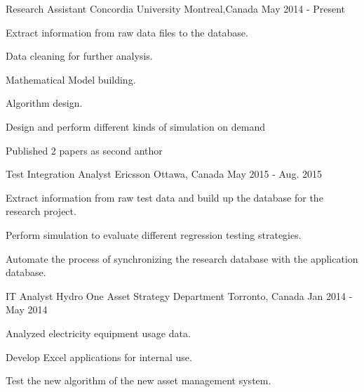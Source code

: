 \documentclass[11pt, a4paper]{awesome-cv} %
\begin{document}
\begin{cventries}
	\cventry
	{Research Assistant} %
	{Concordia University} %
	{Montreal,Canada} %
	{May 2014 - Present} %
	{ %
		\begin{cvitems}
			\item {Extract information from raw data files to the database.}
			\item {Data cleaning for further analysis.}
			\item {Mathematical Model building.}
			\item {Algorithm design.}
			\item {Design and perform different kinds of simulation on demand}
			\item {Published 2 papers as second anthor}
		\end{cvitems}
	}
	
	


	
	
	\cventry
	{Test Integration Analyst} %
	{Ericsson} %
	{Ottawa, Canada} %
	{May 2015 - Aug. 2015} %
	{ %
		\begin{cvitems}
			\item {Extract information from raw test data and build up the database for the research project.}
			\item {Perform simulation to evaluate different regression testing strategies.}
			\item {Automate the process of synchronizing the research database with the application database.}
		\end{cvitems}
	}
	
	
	
	


	
	
	\cventry
	{IT Analyst} %
	{Hydro One Asset Strategy Department} %
	{Torronto, Canada} %
	{Jan 2014 - May 2014} %
	{ %
		\begin{cvitems}
			\item {Analyzed electricity equipment usage data.}
			\item {Develop Excel applications for internal use.}
			\item {Test the new algorithm of the new asset management system.}
		\end{cvitems}
	}
	

\end{cventries}
\end{document}
